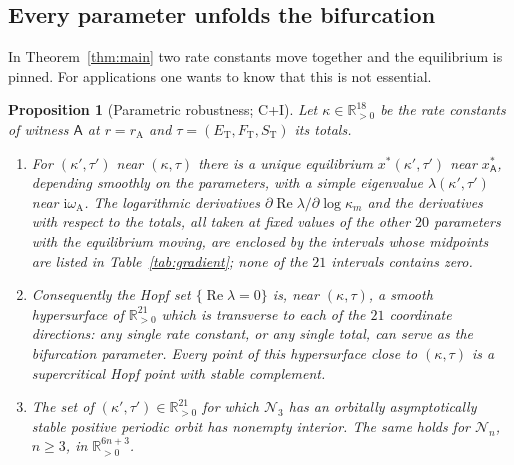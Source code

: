 \documentclass[11pt,a4paper]{article}
\theoremstyle{plain}
\newtheorem{proposition}[theorem]{Proposition}
\theoremstyle{definition}
\theoremstyle{remark}
\newcommand{\R}{\mathbb R}
\newcommand{\ii}{\mathrm i}
\newcommand{\cN}{\mathcal N}
\newcommand{\ET}{E_{\mathrm T}}
\newcommand{\FT}{F_{\mathrm T}}
\newcommand{\ST}{S_{\mathrm T}}
\newcommand{\rA}{r_{\mathrm A}}
\newcommand{\omA}{\omega_{\mathrm A}}
\newcommand{\WA}{\mathsf A}
\DeclareMathOperator{\Ree}{Re}
\newcommand{\evC}{\textsf{C}}
\newcommand{\evI}{\textsf{I}}
\begin{document}
\subsection{Every parameter unfolds the bifurcation}
In Theorem~\ref{thm:main} two rate constants move together and the equilibrium is pinned. For applications one wants to know that this is not essential.

\begin{proposition}[Parametric robustness; \evC+\evI]\label{prop:robust}
Let $\kappa\in\R^{18}_{>0}$ be the rate constants of witness $\WA$ at $r=\rA$ and $\tau=(\ET,\FT,\ST)$ its totals.
\begin{enumerate}[label=\textup{(\alph*)}]
\item For $(\kappa',\tau')$ near $(\kappa,\tau)$ there is a unique equilibrium $x^*(\kappa',\tau')$ near $x^*_{\WA}$, depending smoothly on the parameters, with a simple eigenvalue $\lambda(\kappa',\tau')$ near $\ii\omA$. The logarithmic derivatives $\partial\Ree\lambda/\partial\log\kappa_m$ and the derivatives with respect to the totals, all taken at fixed values of the other $20$ parameters with the equilibrium moving, are enclosed by the intervals whose midpoints are listed in Table~\ref{tab:gradient}; none of the $21$ intervals contains zero.
\item Consequently the Hopf set $\{\Ree\lambda=0\}$ is, near $(\kappa,\tau)$, a smooth hypersurface of $\R^{21}_{>0}$ which is transverse to each of the $21$ coordinate directions: any single rate constant, or any single total, can serve as the bifurcation parameter. Every point of this hypersurface close to $(\kappa,\tau)$ is a supercritical Hopf point with stable complement.
\item The set of $(\kappa',\tau')\in\R^{21}_{>0}$ for which $\cN_3$ has an orbitally asymptotically stable positive periodic orbit has nonempty interior. The same holds for $\cN_n$, $n\ge3$, in $\R^{6n+3}_{>0}$.
\end{enumerate}
\end{proposition}
\end{document}
